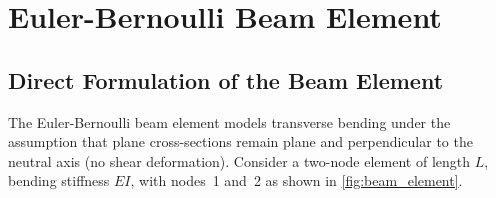 \chapter{Euler-Bernoulli Beam Element}
\label{ch:beam}

\section{Direct Formulation of the Beam Element}
\label{sec:beam_direct}

The Euler-Bernoulli beam element models transverse bending under the assumption
that plane cross-sections remain plane and perpendicular to the neutral axis
(no shear deformation). Consider a two-node element of length $L$, bending
stiffness $EI$, with nodes~1 and~2 as shown in \cref{fig:beam_element}.


